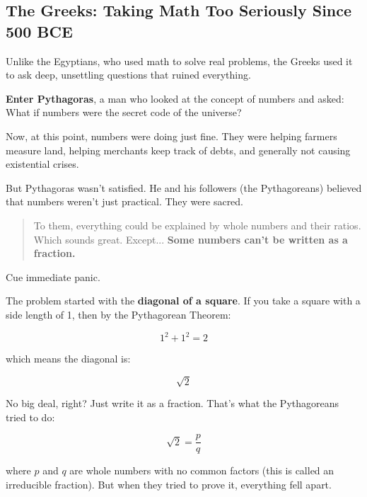 \subsection{The Greeks: Taking Math Too Seriously Since 500 BCE}

Unlike the Egyptians, who used math to solve real problems, the Greeks used it to ask deep, unsettling questions that ruined everything.

\textbf{Enter Pythagoras}, a man who looked at the concept of numbers and asked: What if numbers were the secret code of the universe?

Now, at this point, numbers were doing just fine. They were helping farmers measure land, helping merchants keep track of debts, and generally not causing existential crises.  

But Pythagoras wasn’t satisfied. He and his followers (the Pythagoreans) believed that numbers weren’t just practical. They were sacred.  

\begin{quote}
To them, everything could be explained by whole numbers and their ratios.  Which sounds great. Except...  \textbf{Some numbers can’t be written as a fraction.}
\end{quote}

Cue immediate panic.  

The problem started with the \textbf{diagonal of a square}. If you take a square with a side length of 1, then by the Pythagorean Theorem:

\[
1^2 + 1^2 = 2
\]

which means the diagonal is:

\[
\sqrt{2}
\]

No big deal, right? Just write it as a fraction. That’s what the Pythagoreans tried to do:

\[
\sqrt{2} = \frac{p}{q}
\]

where \( p \) and \( q \) are whole numbers with no common factors (this is called an irreducible fraction). But when they tried to prove it, everything fell apart.


